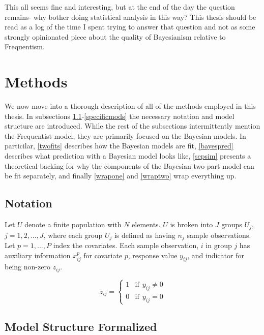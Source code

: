 \documentclass[12pt,twoside]{reedthesis}
\begin{document}
This all seems fine and interesting, but at the end of the day the question remains- why bother doing statistical analysis in this way? This thesis should be read as a log of the time I spent trying to answer that question and not as some strongly opinionated piece about the quality of Bayesianism relative to Frequentism.

\hypertarget{methods-sec}{%
\chapter{Methods}\label{methods-sec}}

We now move into a thorough description of all of the methods employed in this thesis. In subsections \ref{notation}-\ref{specificmods} the necessary notation and model structure are introduced. While the rest of the subsections intermittently mention the Frequentist model, they are primarily focused on the Bayesian models. In particilar, \ref{twofits} describes how the Bayesian models are fit, \ref{bayespred} describes what prediction with a Bayesian model looks like, \ref{sepsim} presents a theoretical backing for why the components of the Bayesian two-part model can be fit separately, and finally \ref{wrapone} and \ref{wraptwo} wrap everything up.

\hypertarget{notation}{%
\section{Notation}\label{notation}}

Let \(U\) denote a finite population with \(N\) elements. \(U\) is broken into \(J\) groups \(U_j\), \(j = 1, 2, ..., J\), where each group \(U_j\) is defined as having \(n_j\) sample observations. Let \(p = 1, ..., P\) index the covariates. Each sample observation, \(i\) in group \(j\) has auxiliary information \(x_{ij}^p\) for covariate \(p\), response value \(y_{ij}\), and indicator for being non-zero \(z_{ij}\).

\[
z_{ij} =
\begin{cases}
1 & \text{if}\ \ y_{ij} \ne 0 \\
0 & \text{if} \ \ y_{ij} = 0
\end{cases}
\]

\hypertarget{model-structure-formalized}{%
\section{Model Structure Formalized}\label{model-structure-formalized}}
\end{document}
